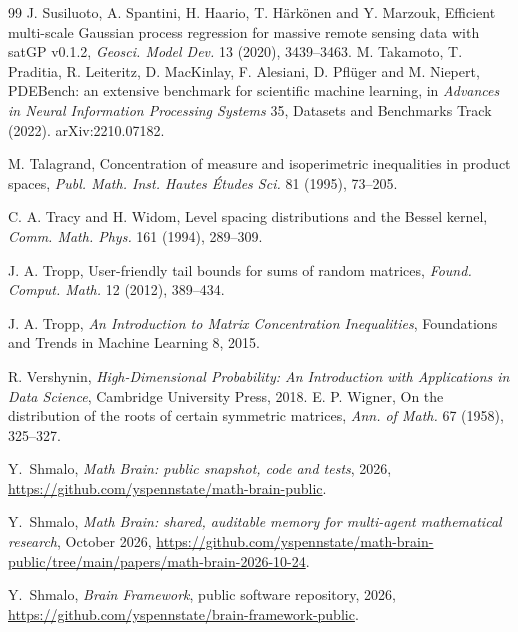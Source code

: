 \documentclass[11pt]{article}
\theoremstyle{definition}
\begin{document}
\begin{thebibliography}{99}
 J. Susiluoto, A. Spantini, H. Haario, T. H\"ark\"onen and Y. Marzouk, Efficient multi-scale Gaussian process regression for massive remote sensing data with satGP v0.1.2, \emph{Geosci. Model Dev.} 13 (2020), 3439--3463.
 M. Takamoto, T. Praditia, R. Leiteritz, D. MacKinlay, F. Alesiani, D. Pfl\"uger
and M. Niepert, PDEBench: an extensive benchmark for scientific machine learning, in \emph{Advances
in Neural Information Processing Systems} 35, Datasets and Benchmarks Track (2022).
arXiv:2210.07182.

 M. Talagrand, Concentration of measure and isoperimetric inequalities in
product spaces, \emph{Publ. Math. Inst. Hautes \'Etudes Sci.} 81 (1995), 73--205.

 C. A. Tracy and H. Widom, Level spacing distributions and the Bessel kernel,
\emph{Comm. Math. Phys.} 161 (1994), 289--309.


 J. A. Tropp, User-friendly tail bounds for sums of random matrices, \emph{Found. Comput. Math.} 12 (2012), 389--434.

 J. A. Tropp, \emph{An Introduction to Matrix Concentration Inequalities}, Foundations and Trends in Machine Learning 8, 2015.

 R. Vershynin, \emph{High-Dimensional Probability: An Introduction with Applications in Data Science}, Cambridge University Press, 2018.
 E. P. Wigner, On the distribution of the roots of certain symmetric matrices,
\emph{Ann. of Math.} 67 (1958), 325--327.

 Y.~Shmalo, \emph{Math Brain: public snapshot, code and tests}, 2026, \url{https://github.com/yspennstate/math-brain-public}.

 Y.~Shmalo, \emph{Math Brain: shared, auditable memory for multi-agent mathematical research}, October 2026, \url{https://github.com/yspennstate/math-brain-public/tree/main/papers/math-brain-2026-10-24}.

 Y.~Shmalo, \emph{Brain Framework}, public software repository, 2026, \url{https://github.com/yspennstate/brain-framework-public}.

\end{thebibliography}
\end{document}
